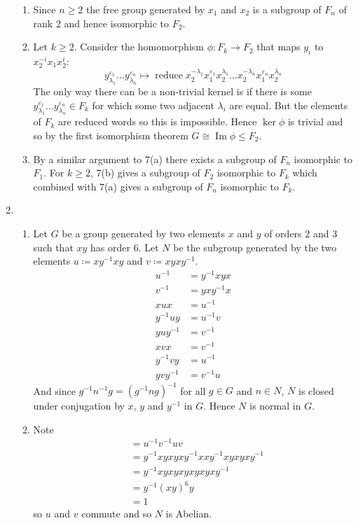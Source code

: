 \documentclass[a4paper, 12pt]{article}
\DeclareMathOperator{\reduce}{reduce}
\DeclareMathOperator{\im}{Im}
\begin{document}
\begin{enumerate}
\begin{enumerate}
\item Since \(n\geq2\) the free group generated by \(x_1\) and \(x_2\) is a subgroup of \(F_n\) of rank 2 and hence isomorphic to \(F_2\).

\item Let \(k\geq2\). Consider the homomorphism \(\phi:F_k\to F_2\) that maps \(y_i\) to \(x_2^{-i}x_1x_2^i\):
\[y_{\lambda_1}^{\varepsilon_1}\dots y_{\lambda_n}^{\varepsilon_n} \mapsto \reduce{x_2^{-\lambda_1}x_1^{\varepsilon_1}x_2^{\lambda_1}\dots x_2^{-\lambda_n}x_1^{\varepsilon_n}x_2^{\lambda_n}}\]
The only way there can be a non-trivial kernel is if there is some \(y_{\lambda_1}^{\varepsilon_1}\dots y_{\lambda_n}^{\varepsilon_n}\in F_k\) for which some two adjacent \(\lambda_i\) are equal. But the elements of \(F_k\) are reduced words so this is impossible. Hence \(\ker\phi\) is trivial and so by the first isomorphism theorem \(G\cong\im\phi\leq F_2\).

\item By a similar argument to 7(a) there exists a subgroup of \(F_n\) isomorphic to \(F_1\). For \(k\geq2\), 7(b) gives a subgroup of \(F_2\) isomorphic to \(F_k\) which combined with 7(a) gives a subgroup of \(F_n\) isomorphic to \(F_k\).

\end{enumerate}

\item \begin{enumerate}

\item Let \(G\) be a group generated by two elements \(x\) and \(y\) of orders 2 and 3 such that \(xy\) has order 6. Let \(N\) be the subgroup generated by the two elements \(u\coloneqq xy^{-1}xy\) and \(v\coloneqq xyxy^{-1}\).
\begin{align*}
u^{-1}&=y^{-1}xyx\\
v^{-1}&=yxy^{-1}x\\
xux&=u^{-1}\\
y^{-1}uy&=u^{-1}v\\
yuy^{-1}&=v^{-1}\\
xvx&=v^{-1}\\
y^{-1}vy&=u^{-1}\\
yvy^{-1}&=v^{-1}u
\end{align*}
And since \(g^{-1}n^{-1}g=(g^{-1}ng)^{-1}\) for all \(g\in G\) and \(n\in N\), \(N\) is closed under conjugation by \(x\), \(y\) and \(y^{-1}\) in \(G\). Hence \(N\) is normal in \(G\).

\item Note
\begin{align*}
[u,v]&=u^{-1}v^{-1}uv\\
&=y^{-1}xyxyxy^{-1}xxy^{-1}xyxyxy^{-1}\\
&=y^{-1}xyxyxyxyxyxy^{-1}\\
&=y^{-1}(xy)^6y\\
&=1
\end{align*}
so \(u\) and \(v\) commute and so \(N\) is Abelian.


\end{enumerate}
\end{enumerate}
\end{document}
